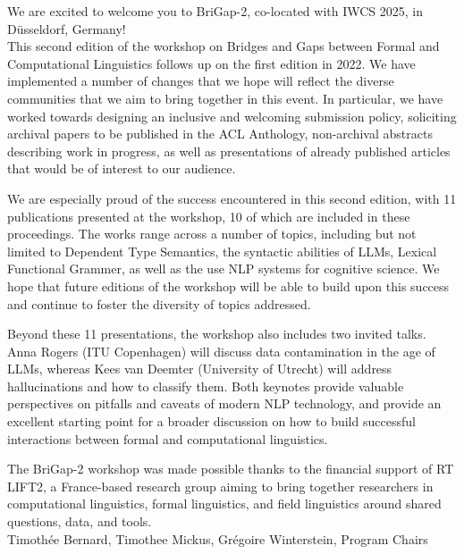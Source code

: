 We are excited to welcome you to BriGap-2, co-located with IWCS 2025, in Düsseldorf, Germany!\\

This second edition of the workshop on Bridges and Gaps between Formal and Computational Linguistics follows up on the first edition in 2022.
We have implemented a number of changes that we hope will reflect the diverse communities that we aim to bring together in this event.
In particular, we have worked towards designing an inclusive and welcoming submission policy, soliciting archival papers to be published in the ACL Anthology, non-archival abstracts describing work in progress, as well as presentations of already published articles that would be of interest to our audience.

We are especially proud of the success encountered in this second edition, with 11 publications presented at the workshop, 10 of which are included in these proceedings.
The works range across a number of topics, including but not limited to Dependent Type Semantics, the syntactic abilities of LLMs, Lexical Functional Grammer, as well as the use NLP systems for cognitive science.
We hope that future editions of the workshop will be able to build upon this success and continue to foster the diversity of topics addressed.

Beyond these 11 presentations, the workshop also includes two invited talks. 
Anna Rogers (ITU Copenhagen) will discuss data contamination in the age of LLMs, whereas Kees van Deemter (University of Utrecht) will address hallucinations and how to classify them.
Both keynotes provide valuable perspectives on pitfalls and caveats of modern NLP technology, and provide an excellent starting point for a broader discussion on how to build successful interactions between formal and computational linguistics.

The BriGap-2 workshop was made possible thanks to the financial support of RT LIFT2, a France-based research group aiming to bring together researchers in computational linguistics, formal linguistics, and field linguistics around shared questions, data, and tools.\\

Timothée Bernard, Timothee Mickus, Grégoire Winterstein, Program Chairs
